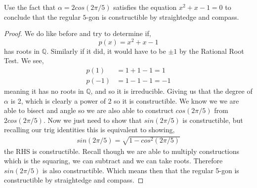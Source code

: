 \documentclass[11pt]{article}
\newenvironment{problem}[2][Problem\!]{\begin{trivlist}
\item[\hskip \labelsep {\bfseries #1}\hskip \labelsep {\bfseries #2}]}{\end{trivlist}}
\newcommand{\qq}{\mathbb Q}   %
\begin{document}
\begin{problem}{13.3.5}
    Use the fact that $\alpha = 2cos(2\pi / 5)$ satisfies the equation $x^{2} +x - 1 = 0$ to conclude that the regular $5$-gon is constructible by straightedge and compass. 
\end{problem}
\begin{example}
    \begin{proof}
        We do like before and try to determine if,
        \[p(x) = x^{2} + x -1 \] has roots in $\qq$. Similarly if it did, it would have to be $\pm1$ by the Rational Root Test. We see,
        \begin{align*}
            p(1) &= 1 + 1 - 1 = 1 \\
            p(-1) &= 1 - 1 -1 = -1 
        \end{align*}
        meaning it has no roots in $\qq$, and so it is irreducible. Giving us that the degree of $\alpha$ is 2, which is clearly a power of 2 so it is constructible. We know we we are able to bisect and angle so we are also able to construct $cos(2\pi/5)$ from $2cos(2\pi/5)$. Now we just need to show that $sin(2\pi/5)$ is constructible, but recalling our trig identities this is equivalent to showing,
        \begin{align*}
            sin(2\pi/5) = \sqrt{1 - cos^{2}(2\pi/5)}
        \end{align*}
        the RHS is constructible. Recall though we are able to multiply constructions which is the squaring, we can subtract and we can take roots. Therefore $sin(2\pi/5)$ is also constructible. Which means then that the regular 5-gon is constructible by straightedge and compass. 
    \end{proof}
\end{example}

\vspace*{.5in}
\end{document}
